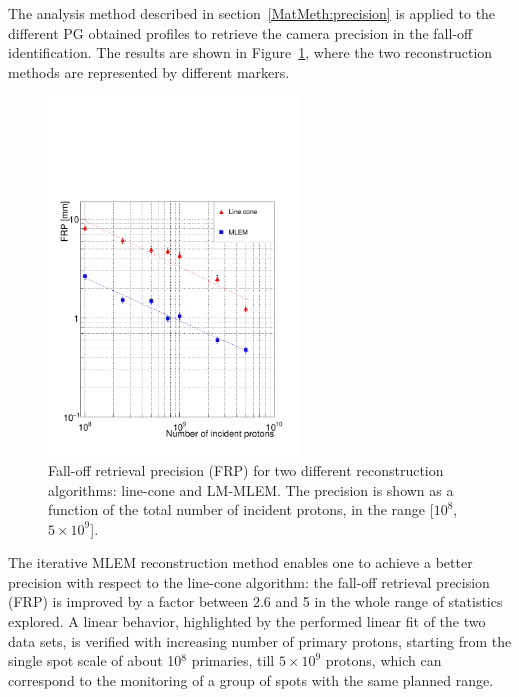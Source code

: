 The analysis method described in section~\ref{MatMeth:precision} is applied to the different PG obtained profiles to retrieve the camera precision in the fall-off identification. The results are shown in Figure~\ref{fig:precision}, where the two reconstruction methods are represented by different markers.

\begin{figure}	
\centering
\includegraphics[width=0.6\textwidth]{./Figure/precision_LC_MLEM.pdf}
\caption{Fall-off retrieval precision (FRP) for two different reconstruction algorithms: line-cone and LM-MLEM. The precision is shown as a function of the total number of incident protons, in the range [$10^{8}$, $5\times10^{9}$].}	
\label{fig:precision}
\end{figure}

The iterative MLEM reconstruction method enables one to achieve a better precision with respect to the line-cone algorithm: the fall-off retrieval precision (FRP) is improved by a factor between 2.6 and 5 in the whole range of statistics explored. A linear behavior, highlighted by the performed linear fit of the two data sets, is verified with increasing number of primary protons, starting from the single spot scale of about 10$^8$ primaries, till $5\times10^9$ protons, which can correspond to the monitoring of a group of spots with the same planned range. 

